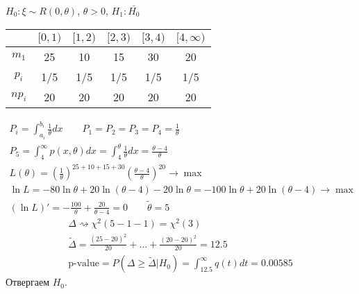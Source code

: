 \documentclass{article}
\begin{document}
\begin{eg}
  $H_0: \xi \sim R(0,\theta)$, $\theta > 0$, $H_1: \bar{H_0}$
\begin{center}
  \begin{tabular}{| c | c | c | c| c| c|}
    \hline
    & $[0,1)$ &$[1,2)$ &$[2,3)$ &$[3,4)$ &$[4,\infty)$ \\ 
    \hline
    $m_1$ & 25 & 10 & 15 & 30 & 20 \\
    \hline
    $p_i$ & 1/5 & 1/5 & 1/5 & 1/5 & 1/5 \\ 
    \hline
    $np_i$ & 20 & 20 & 20 & 20 & 20 \\ 
    \hline
  \end{tabular}
\end{center}
\begin{gather*}
  P_i=\int_{a_i}^{b_i}\frac{1}{\theta}dx \qquad P_1=P_2=P_3=P_4=\frac{1}{\theta} \\
  P_5 = \int_{4}^{\infty}p(x,\theta)dx=\int_{4}^{\theta}\frac{1}{\theta}dx=\frac{\theta-4}{\theta} \\ 
  L(\theta)=\left(\frac{1}{\theta}\right)^{25+10+15+30}\left(\frac{\theta-4}{\theta}\right)^{20} \to \max \\ 
  \ln L = -80 \ln \theta + 20 \ln(\theta-4) - 20 \ln \theta= -100 \ln \theta + 20 \ln (\theta-4) \to \max \\ 
  (\ln L)'=-\frac{10 0}{\theta}+\frac{20}{\theta-4}=0 \qquad \tilde{\theta}=5
\end{gather*}
\begin{gather*}
  \Delta \rightsquigarrow \chi^{2}(5-1-1)=\chi^{2}(3) \\ 
  \tilde{\Delta}=\frac{(25-20)^{2}}{20} + \dots + \frac{(20-20)^{2}}{20}=12.5 \\ 
  \text{p-value}=P(\Delta \ge \tilde{\Delta}|H_0)=\int_{12.5}^{\infty}q(t)dt=0.0 0585
\end{gather*}
Отвергаем $H_0$.
\end{eg}
\end{document}
